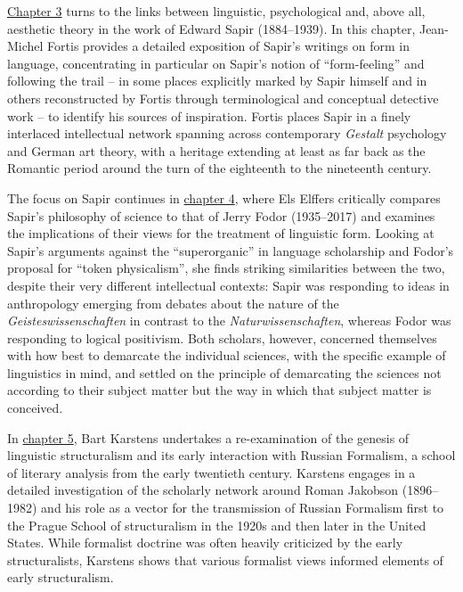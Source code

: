 \documentclass[output=paper]{langscibook}
\begin{document}
\hyperref[chap:fortis]{Chapter 3} turns to the links between linguistic, psychological and, above all, aesthetic theory in the work of Edward Sapir (1884--1939). In this chapter, Jean-Michel Fortis provides a detailed exposition of Sapir's writings on form in language, concentrating in particular on Sapir's notion of ``form-feeling'' and following the trail -- in some places explicitly marked by Sapir himself and in others reconstructed by Fortis through terminological and conceptual detective work -- to identify his sources of inspiration. Fortis places Sapir in a finely interlaced intellectual network spanning across contemporary \emph{Gestalt} psychology and German art theory, with a heritage extending at least as far back as the Romantic period around the turn of the eighteenth to the nineteenth century.

The focus on Sapir continues in \hyperref[chap:elffers]{chapter 4}, where Els Elffers critically compares Sapir's philosophy of science to that of Jerry Fodor (1935--2017) and examines the implications of their views for the treatment of linguistic form. Looking at Sapir's arguments against the ``superorganic'' in language scholarship and Fodor's proposal for ``token physicalism'', she finds striking similarities between the two, despite their very different intellectual contexts: Sapir was responding to ideas in anthropology emerging from debates about the nature of the \emph{Geisteswissenschaften} in contrast to the \emph{Naturwissenschaften}, whereas Fodor was responding to logical positivism. Both scholars, however, concerned themselves with how best to demarcate the individual sciences, with the specific example of linguistics in mind, and settled on the principle of demarcating the sciences not according to their subject matter but the way in which that subject matter is conceived.

In \hyperref[chap:karstens]{chapter 5}, Bart Karstens undertakes a re-examination of the genesis of linguistic structuralism and its early interaction with Russian Formalism, a school of literary analysis from the early twentieth century. Karstens engages in a detailed investigation of the scholarly network around Roman Jakobson (1896--1982) and his role as a vector for the transmission of Russian Formalism first to the Prague School of structuralism in the 1920s and then later in the United States. While formalist doctrine was often heavily criticized by the early structuralists, Karstens shows that various formalist views informed elements of early structuralism.
\end{document}
